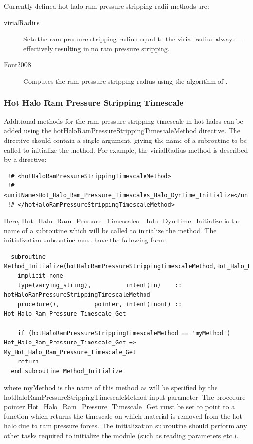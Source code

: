 Currently defined hot halo ram pressure stripping radii methods are:
\begin{description}
 \item [\hyperlink{hot_halo.ram_pressure_stripping.virial_radius.F90:hot_halo_ram_pressure_stripping_virial_radii:hot_halo_ram_pressure_stripping_virial_radius}{{\normalfont \ttfamily virialRadius}}] Sets the ram pressure stripping radius equal to the virial radius always---effectively resulting in no ram pressure stripping.
 \item [\hyperlink{hot_halo.ram_pressure_stripping.Font2008.F90:hot_halo_ram_pressure_stripping_font2008:hot_halo_ram_pressure_stripping_font2008_get}{{\normalfont \ttfamily Font2008}}] Computes the ram pressure stripping radius using the algorithm of \cite{font_colours_2008}.
\end{description}

\subsubsection{Hot Halo Ram Pressure Stripping Timescale}

Additional methods for the ram pressure stripping timescale in hot halos can be added using the {\normalfont \ttfamily hotHaloRamPressureStrippingTimescaleMethod} directive. The directive should contain a single argument, giving the name of a subroutine to be called to initialize the method. For example, the {\normalfont \ttfamily virialRadius} method is described by a directive:
\begin{verbatim}
 !# <hotHaloRamPressureStrippingTimescaleMethod>
 !#  <unitName>Hot_Halo_Ram_Pressure_Timescales_Halo_DynTime_Initialize</unitName>
 !# </hotHaloRamPressureStrippingTimescaleMethod>
\end{verbatim}
Here, {\normalfont \ttfamily Hot\_Halo\_Ram\_Pressure\_Timescales\_Halo\_DynTime\_Initialize} is the name of a subroutine which will be called to initialize the method. The initialization subroutine must have the following form:
\begin{verbatim}
  subroutine Method_Initialize(hotHaloRamPressureStrippingTimescaleMethod,Hot_Halo_Ram_Pressure_Stripping_Get)
    implicit none
    type(varying_string),          intent(in)    :: hotHaloRamPressureStrippingTimescaleMethod
    procedure(),          pointer, intent(inout) :: Hot_Halo_Ram_Pressure_Timescale_Get
    
    if (hotHaloRamPressureStrippingTimescaleMethod == 'myMethod') Hot_Halo_Ram_Pressure_Timescale_Get => My_Hot_Halo_Ram_Pressure_Timescale_Get
    return
  end subroutine Method_Initialize
\end{verbatim}
where {\normalfont \ttfamily myMethod} is the name of this method as will be specified by the {\normalfont \ttfamily hotHaloRamPressureStrippingTimescaleMethod} input parameter. The procedure pointer {\normalfont \ttfamily Hot\_Halo\_Ram\_Pressure\_Timescale\_Get} must be set to point to a function which returns the timescale on which material is removed from the hot halo due to ram pressure forces. The initialization subroutine should perform any other tasks required to initialize the module (such as reading parameters etc.).

